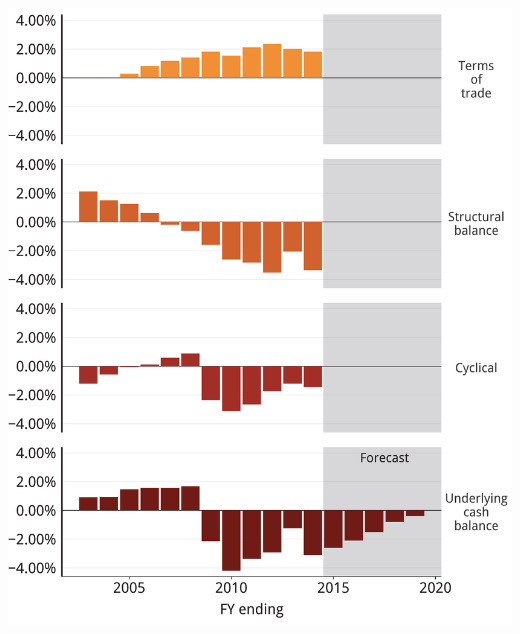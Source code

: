 \documentclass[tikz]{standalone}\usepackage[]{graphicx}\usepackage[]{color}
\newenvironment{knitrout}{}{} %
\begin{document}
\begin{knitrout}
\color{fgcolor}
\includegraphics[width=11.000in,height=13.5in]{./b5-figure/FISCAL-b5-Figure1-1} 

\end{knitrout}
\end{document}
